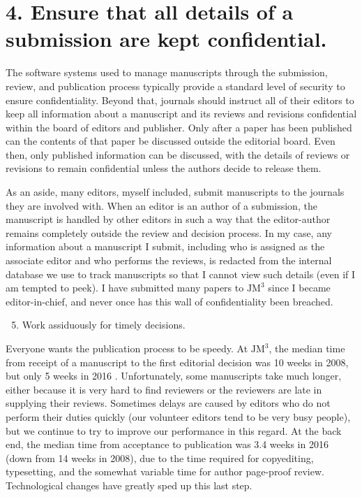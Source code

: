 \section*{4. Ensure that all details of a submission are kept confidential.}
The software systems used to manage manuscripts through the submission, review, and publication process typically provide a standard level of security to ensure confidentiality. Beyond that, journals should instruct all of their editors to keep all information about a manuscript and its reviews and revisions confidential within the board of editors and publisher. Only after a paper has been published can the contents of that paper be discussed outside the editorial board. Even then, only published information can be discussed, with the details of reviews or revisions to remain confidential unless the authors decide to release them.

As an aside, many editors, myself included, submit manuscripts to the journals they are involved with. When an editor is an author of a submission, the manuscript is handled by other editors in such a way that the editor-author remains completely outside the review and decision process. In my case, any information about a manuscript I submit, including who is assigned as the associate editor and who performs the reviews, is redacted from the internal database we use to track manuscripts so that I cannot view such details (even if I am tempted to peek). I have submitted many papers to $\mathrm{JM}^{3}$ since I became editor-in-chief, and never once has this wall of confidentiality been breached.

\begin{enumerate}
  \setcounter{enumi}{4}
  \item Work assiduously for timely decisions.
\end{enumerate}

Everyone wants the publication process to be speedy. At $\mathrm{JM}^{3}$, the median time from receipt of a manuscript to the first editorial decision was 10 weeks in 2008, but only 5 weeks in 2016 . Unfortunately, some manuscripts take much longer, either because it is very hard to find reviewers or the reviewers are late in supplying their reviews. Sometimes delays are caused by editors who do not perform their duties quickly (our volunteer editors tend to be very busy people), but we continue to try to improve our performance in this regard. At the back end, the median time from acceptance to publication was 3.4 weeks in 2016 (down from 14 weeks in 2008), due to the time required for copyediting, typesetting, and the somewhat variable time for author page-proof review. Technological changes have greatly sped up this last step.

